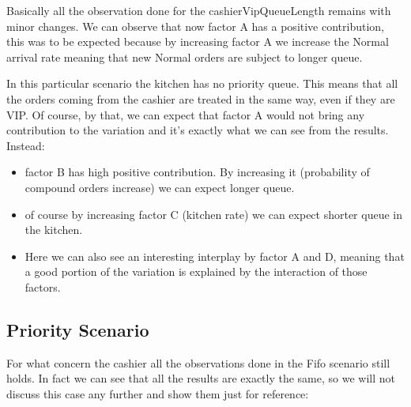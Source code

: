 {{%

Basically all the observation done for the cashierVipQueueLength remains with minor changes. We can observe that now factor A has a positive contribution, this was to be expected because by increasing factor A we increase the Normal arrival rate meaning that new Normal orders are subject to longer queue.


In this particular scenario the kitchen has no priority queue. This means that all the orders coming from the cashier are treated in the same way, even if they are VIP. Of course, by that, we can expect that factor A would not bring any contribution to the variation and it's exactly what we can see from the results. Instead:
\begin{itemize}
    \item factor B has high positive contribution. By increasing it (probability of compound orders increase) we can expect longer queue.
    \item of course by increasing factor C (kitchen rate) we can expect shorter queue in the kitchen.
    \item Here we can also see an interesting interplay by factor A and D, meaning that a good portion of the variation is explained by the interaction of those factors.
\end{itemize}

\subsection{Priority Scenario}



For what concern the cashier all the observations done in the Fifo scenario still holds. In fact we can see that all the results are exactly the same, so we will not discuss this case any further and show them just for reference:








}}

